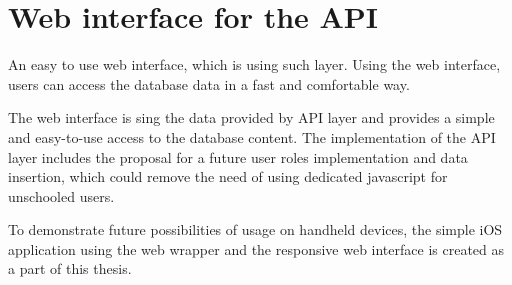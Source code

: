 \chapter{Web interface for the API}
\label{chap:webApp}
\par An easy to use web interface, which is using such layer. Using the web interface, users can access the database data in a fast and comfortable way.

\par The web interface is sing the data provided by API layer and provides a simple and easy-to-use access to the database content. The implementation of the API layer includes the proposal for a future user roles implementation and data insertion, which could remove the need of using dedicated javascript for unschooled users.
\par To demonstrate future possibilities of usage on handheld devices, the simple iOS application using the web wrapper and the responsive web interface is created as a part of this thesis.

